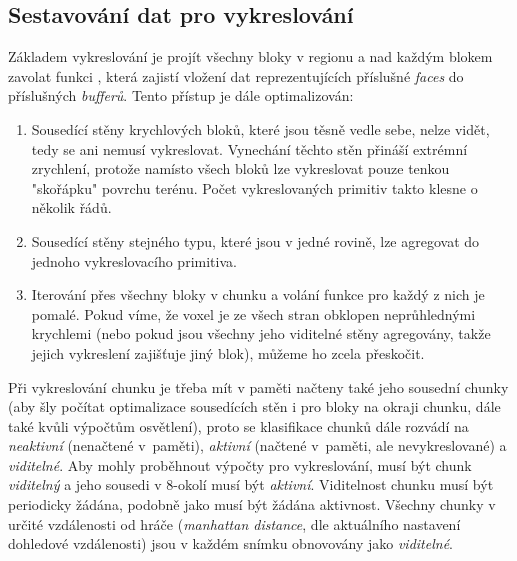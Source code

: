 \subsection{Sestavování dat pro vykreslování} \label{buildDrawData}
Základem vykreslování je projít všechny bloky v regionu a nad každým blokem zavolat funkci , která zajistí vložení dat reprezentujících příslušné \textit{faces} do příslušných \textit{bufferů}. Tento přístup je dále optimalizován:

\begin{enumerate}
	\item Sousedící stěny krychlových bloků, které jsou těsně vedle sebe, nelze vidět, tedy se ani nemusí vykreslovat. Vynechání těchto stěn přináší extrémní zrychlení, protože namísto všech bloků lze vykreslovat pouze tenkou "skořápku" povrchu terénu. Počet vykreslovaných primitiv takto klesne o několik řádů.
	
	\item Sousedící stěny stejného typu, které jsou v jedné rovině, lze agregovat do jednoho vykreslovacího primitiva.
	
	\item Iterování přes všechny bloky v chunku a volání funkce  pro každý z nich je pomalé. Pokud víme, že voxel je ze všech stran obklopen neprůhlednými krychlemi (nebo pokud jsou všechny jeho viditelné stěny agregovány, takže jejich vykreslení zajišťuje jiný blok), můžeme ho zcela přeskočit.
\end{enumerate}

Při vykreslování chunku je třeba mít v paměti načteny také jeho sousední chunky (aby šly počítat optimalizace sousedících stěn i pro bloky na okraji chunku, dále také kvůli výpočtům osvětlení), proto se klasifikace chunků dále rozvádí na \textit{neaktivní} (nenačtené v~paměti), \textit{aktivní} (načtené v~paměti, ale nevykreslované) a \textit{viditelné}. Aby mohly proběhnout výpočty pro vykreslování, musí být chunk \textit{viditelný} a jeho sousedi v 8-okolí musí být \textit{aktivní}. Viditelnost chunku musí být periodicky žádána, podobně jako musí být žádána aktivnost. Všechny chunky v určité vzdálenosti od hráče (\textit{manhattan distance}, dle aktuálního nastavení dohledové vzdálenosti) jsou v každém snímku obnovovány jako \textit{viditelné}.

